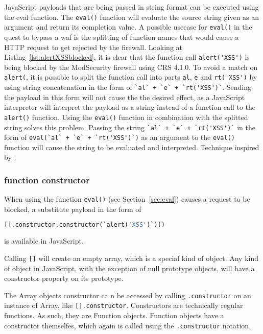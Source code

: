JavaScript payloads that are being passed in string format can be executed using the eval function. The \verb|eval()| function will evaluate the source string given as an argument and return its completion value. \cite{js/eval}
A possible usecase for \verb|eval()| in the quest to bypass a \gls{waf} is the splitting of function names that would cause a HTTP request to get rejected by the firewall.
Looking at Listing~\ref{lst:alertXSSblocked}, it is clear that the function call \verb|alert('XSS')| is being blocked by the ModSecurity firewall using CRS 4.1.0.
To avoid a match on \verb|alert(|, it is possible to split the function call into parts \verb|al|, \verb|e| and \verb|rt('XSS')| by using string concatenation in the form of \verb|`al` + `e` + `rt('XSS')`|.
Sending the payload in this form will not cause the the desired effect, as a JavaScript interpreter will interpret the payload as a string instead of a function call to the \verb|alert()| function.
Using the \verb|eval()| function in combination with the splitted string solves this problem. Passing the string \verb|`al` + `e` + `rt('XSS')`| in the form of \verb|eval(`al` + `e` + `rt('XSS')`)| as an argument to the \verb|eval()| function will cause the string to be evaluated and interpreted. Technique inspired by \cite{onecons/wafbypass}.

\subsubsection{function constructor}
\label{sec:functionconstructor}

When using the function \verb|eval()| (see Section~\ref{sec:eval}) causes a request to be blocked, a substitute payload in the form of

\begin{lstlisting}[style=basicStyle,language=Python]
[].constructor.constructor(`alert('XSS')`)()
\end{lstlisting}

is available in JavaScript.

Calling \verb|[]| will create an empty array, which is a special kind of object.
Any kind of object in JavaScript, with the exception of null prototype objects, will have a constructor property on its prototype. \cite{js/object}

The Array objects constructor ca n be accessed by calling \verb|.constructor| on an instance of Array, like \verb|[].constructor|. \cite{js/array}
Constructors are technically regular functions. \cite{js/constructor}
As such, they are Function objects. Function objects have a constructor themselfes, which again is called using the \verb|.constructor| notation.

